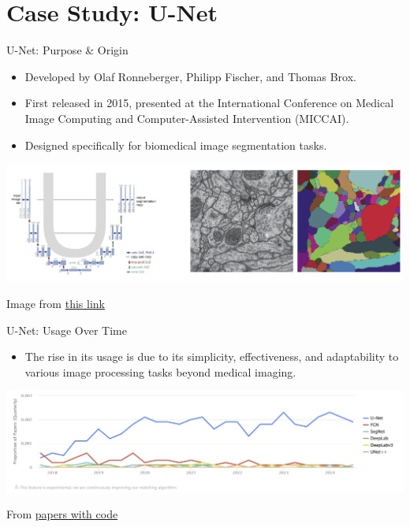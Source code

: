 \documentclass[serif, aspectratio=169]{beamer}
\begin{document}
\section{Case Study: U-Net}


\begin{frame}{U-Net: Purpose \& Origin}
    \begin{itemize}
        \item Developed by Olaf Ronneberger, Philipp Fischer, and Thomas Brox.
        \item First released in 2015, presented at the International Conference on Medical Image Computing and Computer-Assisted Intervention (MICCAI).
        \item Designed specifically for biomedical \textcolor{deepblue}{image segmentation} tasks.
    \end{itemize}
    \begin{center}
        \includegraphics[width=\textwidth]{pic/Unet origin.png} 
    \end{center}

    \vspace{0.3cm}
    \tiny{Image from \href{https://miro.medium.com/v2/resize:fit:1078/1*Dpmg8bywcabPdX08BtlleQ.png}{this link}}
\end{frame}


\begin{frame}{U-Net: Usage Over Time}
    \begin{itemize}
        \item The rise in its usage is due to its simplicity, effectiveness, and adaptability to various image processing tasks beyond medical imaging.
    \end{itemize}

    \begin{center}
        \includegraphics[width=\textwidth]{pic/Unet usage.png} 
    \end{center}

    \vspace{1.4cm}
    \tiny{From \href{https://paperswithcode.com/method/u-net}{papers with code}}
\end{frame}
\end{document}
